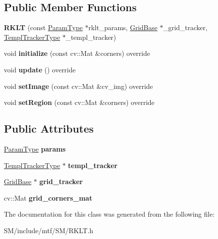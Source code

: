 \subsection*{Public Member Functions}
\begin{DoxyCompactItemize}
\item 
\hypertarget{classRKLT_a392827092ffd180c3e8b47006670b2fa}{{\bfseries R\-K\-L\-T} (const \hyperlink{structRKLTParams}{Param\-Type} $\ast$rklt\-\_\-params, \hyperlink{classGridBase}{Grid\-Base} $\ast$\-\_\-grid\-\_\-tracker, \hyperlink{classSearchMethod}{Templ\-Tracker\-Type} $\ast$\-\_\-templ\-\_\-tracker)}\label{classRKLT_a392827092ffd180c3e8b47006670b2fa}

\item 
\hypertarget{classRKLT_af0f0920b30a6145935c929460ac02f7d}{void {\bfseries initialize} (const cv\-::\-Mat \&corners) override}\label{classRKLT_af0f0920b30a6145935c929460ac02f7d}

\item 
\hypertarget{classRKLT_a99804854bc8962574db3fdd708466114}{void {\bfseries update} () override}\label{classRKLT_a99804854bc8962574db3fdd708466114}

\item 
\hypertarget{classRKLT_a16adec6d646218704f6710d1305372b9}{void {\bfseries set\-Image} (const cv\-::\-Mat \&cv\-\_\-img) override}\label{classRKLT_a16adec6d646218704f6710d1305372b9}

\item 
\hypertarget{classRKLT_aef26040b751817d93160162b195fe273}{void {\bfseries set\-Region} (const cv\-::\-Mat \&corners) override}\label{classRKLT_aef26040b751817d93160162b195fe273}

\end{DoxyCompactItemize}
\subsection*{Public Attributes}
\begin{DoxyCompactItemize}
\item 
\hypertarget{classRKLT_a9b3114c562808735d222f238186afe61}{\hyperlink{structRKLTParams}{Param\-Type} {\bfseries params}}\label{classRKLT_a9b3114c562808735d222f238186afe61}

\item 
\hypertarget{classRKLT_a5e578c22d26c1876f26cf2b7a54d42e2}{\hyperlink{classSearchMethod}{Templ\-Tracker\-Type} $\ast$ {\bfseries templ\-\_\-tracker}}\label{classRKLT_a5e578c22d26c1876f26cf2b7a54d42e2}

\item 
\hypertarget{classRKLT_a6a73d4ac2c97a4485af9ccfcf5296e85}{\hyperlink{classGridBase}{Grid\-Base} $\ast$ {\bfseries grid\-\_\-tracker}}\label{classRKLT_a6a73d4ac2c97a4485af9ccfcf5296e85}

\item 
\hypertarget{classRKLT_a388b66db50d715c6caa74864e9f85f7f}{cv\-::\-Mat {\bfseries grid\-\_\-corners\-\_\-mat}}\label{classRKLT_a388b66db50d715c6caa74864e9f85f7f}

\end{DoxyCompactItemize}


The documentation for this class was generated from the following file\-:\begin{DoxyCompactItemize}
\item 
S\-M/include/mtf/\-S\-M/R\-K\-L\-T.\-h\end{DoxyCompactItemize}

